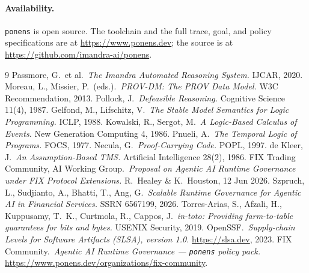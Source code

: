 \documentclass[11pt]{article}
\newcommand{\codeus}{\textunderscore\penalty100\relax}
\newcommand{\code}[1]{\texttt{\let\_\codeus #1}}
\begin{document}
\paragraph{Availability.} \code{ponens} is open source. The toolchain and the full trace, goal, and policy
specifications are at \url{https://www.ponens.dev}; the source is at
\url{https://github.com/imandra-ai/ponens}.

\begin{thebibliography}{9}
 Passmore, G.\ et al.\ \emph{The Imandra Automated Reasoning System.} IJCAR, 2020.
 Moreau, L., Missier, P.\ (eds.).\ \emph{PROV-DM: The PROV Data Model.} W3C Recommendation, 2013.
 Pollock, J.\ \emph{Defeasible Reasoning.} Cognitive Science 11(4), 1987.
 Gelfond, M., Lifschitz, V.\ \emph{The Stable Model Semantics for Logic Programming.} ICLP, 1988.
 Kowalski, R., Sergot, M.\ \emph{A Logic-Based Calculus of Events.} New Generation Computing 4, 1986.
 Pnueli, A.\ \emph{The Temporal Logic of Programs.} FOCS, 1977.
 Necula, G.\ \emph{Proof-Carrying Code.} POPL, 1997.
 de Kleer, J.\ \emph{An Assumption-Based TMS.} Artificial Intelligence 28(2), 1986.
 FIX Trading Community, AI Working Group.\ \emph{Proposal on Agentic AI Runtime Governance under FIX Protocol Extensions.} R.\ Healey \& K.\ Houston, 12 Jun 2026.
 Szpruch, L., Sudjianto, A., Bhatti, T., Ang, G.\ \emph{Scalable Runtime Governance for Agentic AI in Financial Services.} SSRN 6567199, 2026.
 Torres-Arias, S., Afzali, H., Kuppusamy, T.\ K., Curtmola, R., Cappos, J.\ \emph{in-toto: Providing farm-to-table guarantees for bits and bytes.} USENIX Security, 2019.
 OpenSSF.\ \emph{Supply-chain Levels for Software Artifacts (SLSA), version 1.0.} \url{https://slsa.dev}, 2023.
 FIX Community.\ \emph{Agentic AI Runtime Governance --- \code{ponens} policy pack.} \url{https://www.ponens.dev/organizations/fix-community}.
\end{thebibliography}
\end{document}
